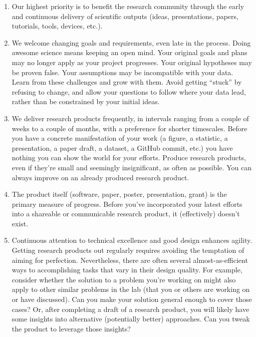 \documentclass{tufte-book} %
\begin{document}
\begin{enumerate}
\item Our highest priority is to benefit the research community
  through the early and continuous delivery of scientific outputs
  (ideas, presentations, papers, tutorials, tools, devices, etc.).

\item We welcome changing goals and requirements, even late in the
  process.  Doing awesome science means keeping an open mind.  Your
  original goals and plans may no longer apply as your project
  progresses.  Your original hypotheses may be proven false.  Your
  assumptions may be incompatible with your data.  Learn from these
  challenges and grow with them.  Avoid getting ``stuck'' by refusing
  to change, and allow your questions to follow where your data lead,
  rather than be constrained by your initial ideas.

\item We deliver research products frequently, in intervals ranging
  from a couple of weeks to a couple of months, with a preference for
  shorter timescales.  Before you have a concrete manifestation of
  your work (a figure, a statistic, a presentation, a paper draft, a
  dataset, a GitHub commit, etc.) you have nothing you can show the
  world for your efforts.  Produce research products, even if they're
  small and seemingly insignificant, as often as possible.  You can
  always improve on an already produced research product.

\item The product itself (software, paper, poster, presentation,
  grant) is the primary measure of progress.  Before you've
  incorporated your latest efforts into a shareable or communicable
  research product, it (effectively) doesn't exist.

\item Continuous attention to technical excellence and good design
  enhances agility.  Getting research products out regularly requires
  avoiding the temptation of aiming for perfection.  Nevertheless,
  there are often several almost-as-efficient ways to accomplishing
  tasks that vary in their design quality.  For example, consider
  whether the solution to a problem you're working on might also apply
  to other similar problems in the lab (that you or others are working
  on or have discussed).  Can you make your solution general enough to
  cover those cases?  Or, after completing a draft of a research
  product, you will likely have some insights into alternative
  (potentially better) approaches.  Can you tweak the product to
  leverage those insights?


\end{enumerate}
\end{document}
